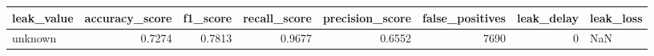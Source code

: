 \begin{tabular}{lrrrrrrl}
\toprule
leak\_value & accuracy\_score & f1\_score & recall\_score & precision\_score & false\_positives & leak\_delay & leak\_loss \\
\midrule
unknown & 0.7274 & 0.7813 & 0.9677 & 0.6552 & 7690 & 0 & NaN \\
\bottomrule
\end{tabular}
